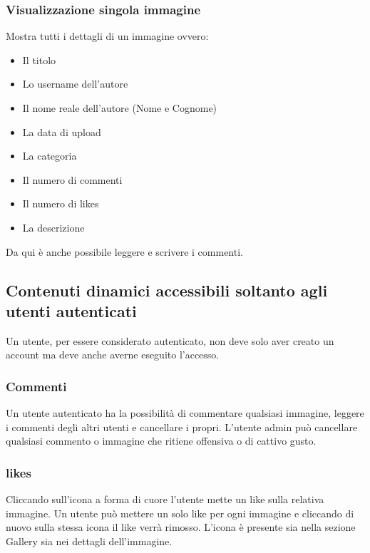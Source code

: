\documentclass[openany, a4paper, 12pt]{report}
\begin{document}
		\subsubsection{Visualizzazione singola immagine}
		Mostra tutti i dettagli di un immagine ovvero:
		\begin{itemize}
					\item Il titolo
					\item Lo username dell'autore
					\item Il nome reale dell'autore (Nome e Cognome)
					\item La data di upload
					\item La categoria
					\item Il numero di commenti
					\item Il numero di likes
					\item La descrizione
		\end{itemize}
		Da qui è anche possibile leggere e scrivere i commenti.
				
	\subsection{Contenuti dinamici accessibili soltanto agli utenti autenticati}
	Un utente, per essere considerato autenticato, non deve solo aver creato un account ma deve anche averne eseguito l'accesso.
	
		\subsubsection{Commenti}
		Un utente autenticato ha la possibilità di commentare qualsiasi immagine, leggere i commenti degli altri utenti e cancellare i propri. L'utente admin può cancellare qualsiasi commento o immagine che ritiene offensiva o di cattivo gusto.
		
		\subsubsection{likes}
		Cliccando sull'icona a forma di cuore l'utente mette un like sulla relativa immagine. Un utente può mettere un solo like per ogni immagine e cliccando di nuovo sulla stessa icona il like verrà rimosso.
		L'icona è presente sia nella sezione Gallery sia nei dettagli dell'immagine.
\end{document}
